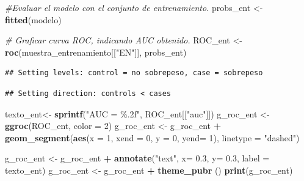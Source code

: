 \documentclass[
]{article}
\newenvironment{Shaded}{\begin{snugshade}}{\end{snugshade}}
\newcommand{\AttributeTok}[1]{\textcolor[rgb]{0.13,0.29,0.53}{#1}}
\newcommand{\CommentTok}[1]{\textcolor[rgb]{0.56,0.35,0.01}{\textit{#1}}}
\newcommand{\DecValTok}[1]{\textcolor[rgb]{0.00,0.00,0.81}{#1}}
\newcommand{\FloatTok}[1]{\textcolor[rgb]{0.00,0.00,0.81}{#1}}
\newcommand{\FunctionTok}[1]{\textcolor[rgb]{0.13,0.29,0.53}{\textbf{#1}}}
\newcommand{\NormalTok}[1]{#1}
\newcommand{\OtherTok}[1]{\textcolor[rgb]{0.56,0.35,0.01}{#1}}
\newcommand{\SpecialCharTok}[1]{\textcolor[rgb]{0.81,0.36,0.00}{\textbf{#1}}}
\newcommand{\StringTok}[1]{\textcolor[rgb]{0.31,0.60,0.02}{#1}}
\begin{document}
\begin{Shaded}
\begin{Highlighting}[]
\CommentTok{\#Evaluar el modelo con el conjunto de entrenamiento.}
\NormalTok{probs\_ent }\OtherTok{\textless{}{-}} \FunctionTok{fitted}\NormalTok{(modelo)}

\CommentTok{\# Graficar curva ROC, indicando AUC obtenido.}
\NormalTok{ROC\_ent }\OtherTok{\textless{}{-}} \FunctionTok{roc}\NormalTok{(muestra\_entrenamiento[[}\StringTok{"EN"}\NormalTok{]], probs\_ent) }
\end{Highlighting}
\end{Shaded}

\begin{verbatim}
## Setting levels: control = no sobrepeso, case = sobrepeso
\end{verbatim}

\begin{verbatim}
## Setting direction: controls < cases
\end{verbatim}

\begin{Shaded}
\begin{Highlighting}[]
\NormalTok{texto\_ent}\OtherTok{\textless{}{-}} \FunctionTok{sprintf}\NormalTok{(}\StringTok{"AUC = \%.2f"}\NormalTok{, ROC\_ent[[}\StringTok{"auc"}\NormalTok{]])}
\NormalTok{g\_roc\_ent }\OtherTok{\textless{}{-}} \FunctionTok{ggroc}\NormalTok{(ROC\_ent, }\AttributeTok{color =} \DecValTok{2}\NormalTok{)}
\NormalTok{g\_roc\_ent }\OtherTok{\textless{}{-}}\NormalTok{ g\_roc\_ent }\SpecialCharTok{+} \FunctionTok{geom\_segment}\NormalTok{(}\FunctionTok{aes}\NormalTok{(}\AttributeTok{x =} \DecValTok{1}\NormalTok{, }\AttributeTok{xend =} \DecValTok{0}\NormalTok{, }\AttributeTok{y =}
                                            \DecValTok{0}\NormalTok{, }\AttributeTok{yend=} \DecValTok{1}\NormalTok{), }\AttributeTok{linetype =} \StringTok{"dashed"}\NormalTok{)}

\NormalTok{g\_roc\_ent }\OtherTok{\textless{}{-}}\NormalTok{ g\_roc\_ent }\SpecialCharTok{+} \FunctionTok{annotate}\NormalTok{(}\StringTok{"text"}\NormalTok{, }\AttributeTok{x=} \FloatTok{0.3}\NormalTok{, }\AttributeTok{y=} \FloatTok{0.3}\NormalTok{,}
                                  \AttributeTok{label =}\NormalTok{ texto\_ent)}
\NormalTok{g\_roc\_ent }\OtherTok{\textless{}{-}}\NormalTok{ g\_roc\_ent }\SpecialCharTok{+} \FunctionTok{theme\_pubr}\NormalTok{ ()}
\FunctionTok{print}\NormalTok{(g\_roc\_ent)}
\end{Highlighting}
\end{Shaded}
\end{document}
